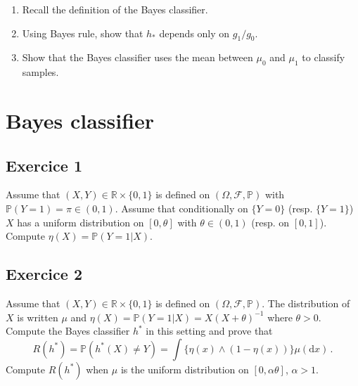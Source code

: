 \documentclass[a4paper,10pt,fleqn]{article}
\newcommand{\eqsp}{\,}
\newcommand{\rmd}{\mathrm{d}}
\newcommand{\rset}{\ensuremath{\mathbb{R}}}
\newcommand{\bP}{\mathbb{P}}
\newcommand{\1}{\ensuremath{\mathbbm{1}}}
\begin{document}
\begin{enumerate}
\item Recall the definition of the Bayes classifier.
%
%

\item Using Bayes rule, show that  $h_*$ depends only on $g_1/g_0$.
%
%

\item Show that the Bayes classifier uses the mean between  $\mu_0$ and  $\mu_1$ to classify samples.
%
%
\end{enumerate}



\section{Bayes classifier}
\subsection{Exercice 1}
Assume that $(X,Y)\in\mathbb{R}\times\{0,1\}$ is defined on $(\Omega,\mathcal{F},\mathbb{P})$ with $\mathbb{P}(Y=1) = \pi \in(0,1)$.  Assume that conditionally on $\{Y=0\}$ (resp. $\{Y=1\}$) $X$ has a uniform distribution on $[0,\theta]$ with $\theta\in(0,1)$ (resp. on $[0,1]$). Compute $\eta(X) = \mathbb{P}(Y=1 |X)$.

\subsection{Exercice 2}
Assume that $(X,Y)\in\mathbb{R}\times\{0,1\}$ is defined on $(\Omega,\mathcal{F},\mathbb{P})$. The distribution of $X$ is written $\mu$ and $\eta(X) = \mathbb{P}(Y=1|X) = X(X+\theta)^{-1}$ where $\theta>0$. Compute the Bayes classifier $h^*$ in this setting and prove that
$$
R(h^*) = \bP(h^*(X)\neq Y) = \int \{\eta(x) \wedge (1-\eta(x))\}\mu(\rmd x)\,.
$$
Compute $R(h^*)$ when $\mu$ is the uniform distribution on $[0,\alpha \theta]$, $\alpha>1$. 
\end{document}
